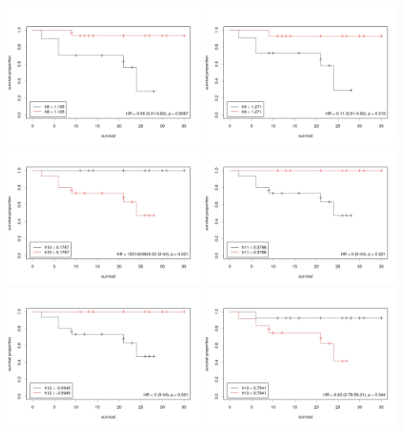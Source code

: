 \documentclass{article}
\begin{document}
  \includegraphics[width=65mm]{plots/h8.jpg} \includegraphics[width=65mm]{plots/h9.jpg} \\
  \includegraphics[width=65mm]{plots/h10.jpg} \includegraphics[width=65mm]{plots/h11.jpg} \\
  \includegraphics[width=65mm]{plots/h12.jpg} \includegraphics[width=65mm]{plots/h13.jpg} \\
\end{document}
